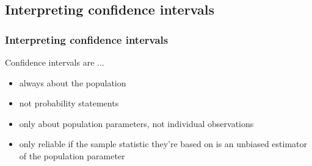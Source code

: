 
\subsection{Interpreting confidence intervals}


\begin{frame}
\frametitle{Interpreting confidence intervals}

Confidence intervals are ...

\begin{itemize}

\item always about the population

\item not probability statements 

\item only about population parameters, not individual observations

\item only reliable if the sample statistic they're based on is an unbiased estimator of the population parameter

\end{itemize}

\end{frame}

